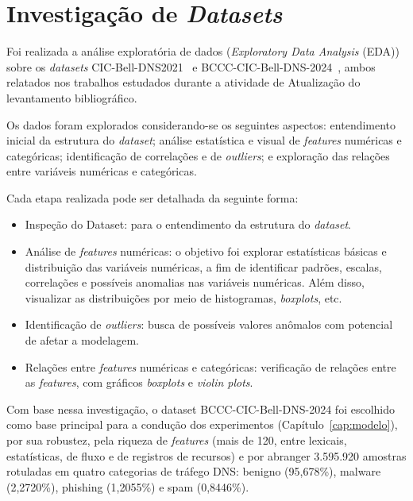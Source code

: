 \chapter{Investigação de \textit{Datasets}}
\label{cap:datasets}

Foi realizada a análise exploratória de dados (\textit{Exploratory Data Analysis} (EDA)) sobre os \textit{datasets}
CIC-Bell-DNS2021~\citep{cic-bell-dns-2021} e BCCC-CIC-Bell-DNS-2024~\citep{shafi2024dns}, ambos relatados nos trabalhos estudados durante a atividade de Atualização do levantamento bibliográfico.

Os dados foram explorados considerando-se os seguintes aspectos: entendimento inicial da estrutura do \textit{dataset}; análise estatística e visual de \textit{features} numéricas e categóricas; identificação de correlações e de \textit{outliers}; e exploração das relações entre variáveis numéricas e categóricas.

Cada etapa realizada pode ser detalhada da seguinte forma:

\begin{itemize}
    \item Inspeção do Dataset: para o entendimento da estrutura do \textit{dataset}.
    \item Análise de \textit{features} numéricas: o objetivo foi explorar estatísticas básicas e distribuição das variáveis numéricas, a fim de identificar padrões, escalas, correlações e possíveis anomalias nas variáveis numéricas. Além disso, visualizar as distribuições por meio de histogramas, \textit{boxplots}, etc.
    \item Identificação de \textit{outliers}: busca de possíveis valores anômalos com potencial de afetar a modelagem.
    \item Relações entre \textit{features} numéricas e categóricas: verificação de relações entre as \textit{features}, com gráficos \textit{boxplots} e \textit{violin plots}.
\end{itemize}

Com base nessa investigação, o dataset BCCC-CIC-Bell-DNS-2024 foi escolhido como base principal para a condução dos experimentos (Capítulo~\ref{cap:modelo}), por sua robustez, pela riqueza de \textit{features} (mais de 120, entre lexicais, estatísticas, de fluxo e de registros de recursos) e por abranger 3.595.920 amostras rotuladas em quatro categorias de tráfego DNS: benigno (95,678\%), malware (2,2720\%), phishing (1,2055\%) e spam (0,8446\%).